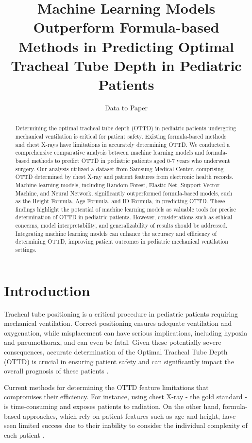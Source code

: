 \documentclass[11pt]{article}
\title{Machine Learning Models Outperform Formula-based Methods in Predicting Optimal Tracheal Tube Depth in Pediatric Patients}
\author{Data to Paper}
\begin{document}
\maketitle
\begin{abstract}
Determining the optimal tracheal tube depth (OTTD) in pediatric patients undergoing mechanical ventilation is critical for patient safety. Existing formula-based methods and chest X-rays have limitations in accurately determining OTTD. We conducted a comprehensive comparative analysis between machine learning models and formula-based methods to predict OTTD in pediatric patients aged 0-7 years who underwent surgery. Our analysis utilized a dataset from Samsung Medical Center, comprising OTTD determined by chest X-ray and patient features from electronic health records. Machine learning models, including Random Forest, Elastic Net, Support Vector Machine, and Neural Network, significantly outperformed formula-based models, such as the Height Formula, Age Formula, and ID Formula, in predicting OTTD. These findings highlight the potential of machine learning models as valuable tools for precise determination of OTTD in pediatric patients. However, considerations such as ethical concerns, model interpretability, and generalizability of results should be addressed. Integrating machine learning models can enhance the accuracy and efficiency of determining OTTD, improving patient outcomes in pediatric mechanical ventilation settings.
\end{abstract}
\section*{Introduction}

Tracheal tube positioning is a critical procedure in pediatric patients requiring mechanical ventilation. Correct positioning ensures adequate ventilation and oxygenation, while misplacement can have serious implications, including hypoxia and pneumothorax, and can even be fatal. Given these potentially severe consequences, accurate determination of the Optimal Tracheal Tube Depth (OTTD) is crucial in ensuring patient safety and can significantly impact the overall prognosis of these patients \cite{Klompas2011MulticenterEO, Ladha2015IntraoperativePM, Cot2016GuidelinesFM, Burns2014NoninvasiveVA}. 

Current methods for determining the OTTD feature limitations that compromises their efficiency. For instance, using chest X-ray - the gold standard - is time-consuming and exposes patients to radiation. On the other hand,  formula-based approaches, which rely on patient features such as age and height, have seen limited success due to their inability to consider the individual complexity of each patient \cite{Maggiore2013DecreasingTA, Gldner2015IntraoperativePM, Severgnini2013ProtectiveMV, Neto2015LungProtectiveVW}. 
\end{document}
